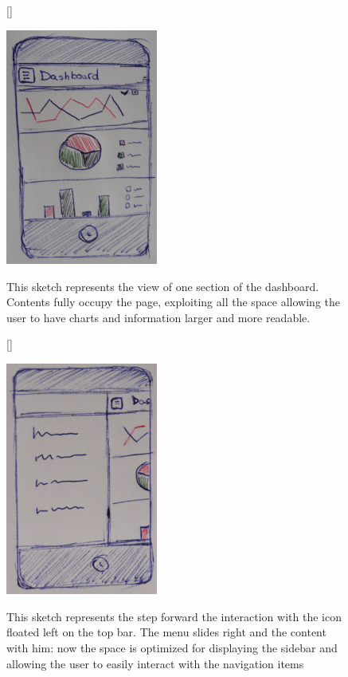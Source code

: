 \documentclass[a4paper,13pt]{report}
\begin{document}
\begin{figure}[H]
[\FBwidth]
{\caption{This sketch represents the view of one section of the dashboard. Contents fully occupy the page, exploiting all the space allowing the user to have charts and information larger and more readable.}\label{fig:test}}
{\includegraphics[width=5cm]{pics/UISketches/mobileSK1}}
\end{figure}





\begin{figure}[H]
[\FBwidth]
{\caption{This sketch represents the step forward the interaction with the icon floated left on the top bar. The menu slides right and the content with him: now the space is optimized for displaying the sidebar and allowing the user to easily interact with the navigation items}\label{fig:test}}
{\includegraphics[width=5cm]{pics/UISketches/mobileSK2}}
\end{figure}
\end{document}

